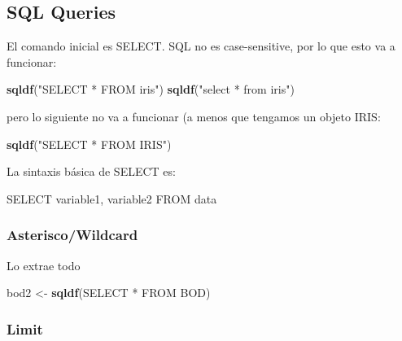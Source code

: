 \documentclass[
]{book}
\newenvironment{Shaded}{\begin{snugshade}}{\end{snugshade}}
\newcommand{\FunctionTok}[1]{\textcolor[rgb]{0.13,0.29,0.53}{\textbf{#1}}}
\newcommand{\NormalTok}[1]{#1}
\newcommand{\OtherTok}[1]{\textcolor[rgb]{0.56,0.35,0.01}{#1}}
\newcommand{\StringTok}[1]{\textcolor[rgb]{0.31,0.60,0.02}{#1}}
\begin{document}
\subsection{SQL Queries}\label{sql-queries}

El comando inicial es SELECT. SQL no es case-sensitive, por lo que esto va a funcionar:

\begin{Shaded}
\begin{Highlighting}[]
\FunctionTok{sqldf}\NormalTok{(}\StringTok{"SELECT * FROM iris"}\NormalTok{)}
\FunctionTok{sqldf}\NormalTok{(}\StringTok{"select * from iris"}\NormalTok{)}
\end{Highlighting}
\end{Shaded}

pero lo siguiente no va a funcionar (a menos que tengamos un objeto IRIS:

\begin{Shaded}
\begin{Highlighting}[]
\FunctionTok{sqldf}\NormalTok{(}\StringTok{"SELECT * FROM IRIS"}\NormalTok{)}
\end{Highlighting}
\end{Shaded}

La sintaxis básica de SELECT es:

\begin{Shaded}
\begin{Highlighting}[]
\NormalTok{SELECT variable1, variable2 FROM data}
\end{Highlighting}
\end{Shaded}

\subsubsection{Asterisco/Wildcard}\label{asteriscowildcard}

Lo extrae todo

\begin{Shaded}
\begin{Highlighting}[]
\NormalTok{bod2 }\OtherTok{\textless{}{-}} \FunctionTok{sqldf}\NormalTok{(}\StringTok{\textquotesingle{}SELECT * FROM BOD\textquotesingle{}}\NormalTok{)}
\end{Highlighting}
\end{Shaded}

\subsubsection{Limit}\label{limit}
\end{document}
